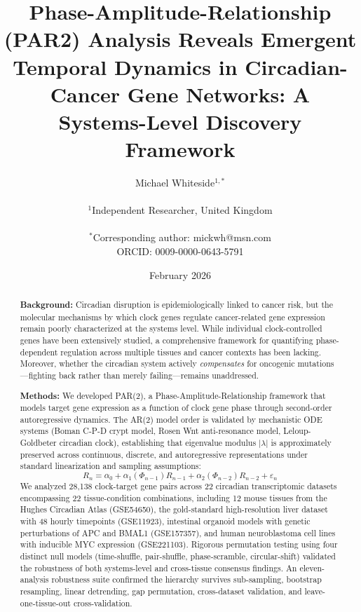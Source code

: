 \documentclass[11pt,a4paper]{article}
\title{\textbf{Phase-Amplitude-Relationship (PAR2) Analysis Reveals Emergent Temporal Dynamics in Circadian-Cancer Gene Networks: A Systems-Level Discovery Framework}}
\author{
Michael Whiteside$^{1,*}$ \\
\\
\small $^1$Independent Researcher, United Kingdom \\
\\
\small $^*$Corresponding author: mickwh@msn.com \\
\small ORCID: 0009-0000-0643-5791
}
\date{February 2026}
\begin{document}
\maketitle
\linenumbers

\begin{abstract}
\textbf{Background:} Circadian disruption is epidemiologically linked to cancer risk, but the molecular mechanisms by which clock genes regulate cancer-related gene expression remain poorly characterized at the systems level. While individual clock-controlled genes have been extensively studied, a comprehensive framework for quantifying phase-dependent regulation across multiple tissues and cancer contexts has been lacking. Moreover, whether the circadian system actively \textit{compensates} for oncogenic mutations---fighting back rather than merely failing---remains unaddressed.

\textbf{Methods:} We developed PAR(2), a Phase-Amplitude-Relationship framework that models target gene expression as a function of clock gene phase through second-order autoregressive dynamics. The AR(2) model order is validated by mechanistic ODE systems (Boman C-P-D crypt model, Rosen Wnt anti-resonance model, Leloup-Goldbeter circadian clock), establishing that eigenvalue modulus $|\lambda|$ is approximately preserved across continuous, discrete, and autoregressive representations under standard linearization and sampling assumptions:
\[R_n = \alpha_0 + \alpha_1(\Phi_{n-1})R_{n-1} + \alpha_2(\Phi_{n-2})R_{n-2} + \varepsilon_n\]
We analyzed 28,138 clock-target gene pairs across 22 circadian transcriptomic datasets encompassing 22 tissue-condition combinations, including 12 mouse tissues from the Hughes Circadian Atlas (GSE54650), the gold-standard high-resolution liver dataset with 48 hourly timepoints (GSE11923), intestinal organoid models with genetic perturbations of APC and BMAL1 (GSE157357), and human neuroblastoma cell lines with inducible MYC expression (GSE221103). Rigorous permutation testing using four distinct null models (time-shuffle, pair-shuffle, phase-scramble, circular-shift) validated the robustness of both systems-level and cross-tissue consensus findings. An eleven-analysis robustness suite confirmed the hierarchy survives sub-sampling, bootstrap resampling, linear detrending, gap permutation, cross-dataset validation, and leave-one-tissue-out cross-validation.


\end{abstract}
\end{document}
